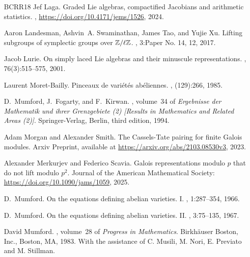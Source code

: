 \begin{thebibliography}{BCRR18}
Jef Laga.
\newblock Graded {L}ie algebras, compactified {J}acobians and arithmetic
  statistics.
,
  \url{https://doi.org/10.4171/jems/1526}, 2024.

Aaron Landesman, Ashvin~A. Swaminathan, James Tao, and Yujie Xu.
\newblock Lifting subgroups of symplectic groups over {$\Bbb{Z}/\ell\Bbb{Z}$}.
, 3:Paper No. 14, 12, 2017.

Jacob Lurie.
\newblock On simply laced {L}ie algebras and their minuscule representations.
, 76(3):515--575, 2001.

Laurent Moret-Bailly.
\newblock Pinceaux de vari\'{e}t\'{e}s ab\'{e}liennes.
, (129):266, 1985.

D.~Mumford, J.~Fogarty, and F.~Kirwan.
, volume~34 of {\em Ergebnisse der
  Mathematik und ihrer Grenzgebiete (2) [Results in Mathematics and Related
  Areas (2)]}.
\newblock Springer-Verlag, Berlin, third edition, 1994.

Adam Morgan and Alexander Smith.
\newblock The {C}assels-{T}ate pairing for finite {G}alois modules.
\newblock Arxiv Preprint, available at
  \url{https://arxiv.org/abs/2103.08530v3}, 2023.

Alexander Merkurjev and Federico Scavia.
\newblock Galois representations modulo $p$ that do not lift modulo $p^2$.
\newblock Journal of the American Mathematical Society:
  \url{https://doi.org/10.1090/jams/1059}, 2025.

D.~Mumford.
\newblock On the equations defining abelian varieties. {I}.
, 1:287--354, 1966.

D.~Mumford.
\newblock On the equations defining abelian varieties. {II}.
, 3:75--135, 1967.

David Mumford.
, volume~28 of {\em Progress in
  Mathematics}.
\newblock Birkh\"{a}user Boston, Inc., Boston, MA, 1983.
\newblock With the assistance of C. Musili, M. Nori, E. Previato and M.
  Stillman.


\end{thebibliography}
